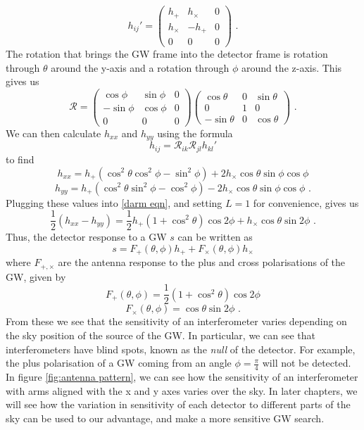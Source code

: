 \documentclass[11pt]{cuthesis}
\newcommand{\fs}{\text{ .}}
\begin{document}
\[
h_{ij}'
=
\begin{pmatrix}
h_+ & h_\times & 0 \\
h_\times & -h_+ & 0 \\
0 & 0 & 0
\end{pmatrix} \fs
\]
The rotation that brings the GW frame into the detector frame is rotation through $\theta$ around the y-axis and a rotation through $\phi$ around the z-axis. This gives us
\[
\mathcal{R}
=
\begin{pmatrix}
\cos \phi & \sin \phi & 0 \\
-\sin \phi & \cos \phi & 0 \\
0 & 0 & 0
\end{pmatrix}
\begin{pmatrix}
\cos \theta & 0 & \sin \theta \\
0 & 1 & 0 \\
-\sin \theta & 0 & \cos \theta
\end{pmatrix} \fs
\]
We can then calculate $h_{xx}$ and $h_{yy}$ using the formula
\begin{equation}
h_{ij} = \mathcal{R}_{ik} \mathcal{R}_{jl} h_{kl}'
\end{equation}
to find
\begin{equation}
h_{xx} = h_+(\cos^2 \theta \cos^2 \phi - \sin^2 \phi) + 2h_\times \cos \theta \sin\phi \cos\phi
\end{equation}
\begin{equation}
h_{yy} = h_+(\cos^2 \theta \sin^2 \phi - \cos^2 \phi) - 2h_\times \cos \theta \sin\phi \cos\phi \fs
\end{equation}
Plugging these values into \ref{darm eqn}, and setting $L=1$ for convenience, gives us
\begin{equation}
\frac{1}{2} (h_{xx} - h_{yy}) = \frac{1}{2} h_+ (1+\cos^2\theta)\cos 2\phi + h_\times \cos \theta \sin 2\phi \fs
\end{equation}
Thus, the detector response to a GW $s$ can be written as
\begin{equation}
s = F_+(\theta,\phi)h_+ + F_\times(\theta,\phi) h_\times
\end{equation}
where $F_{+,\times}$ are the antenna response to the plus and cross polarisations of the GW, given by
\begin{equation}
F_+(\theta,\phi) = \frac{1}{2} (1+\cos^2\theta)\cos 2\phi
\end{equation}
\begin{equation}
F_\times(\theta,\phi) = \cos \theta \sin 2\phi \fs
\end{equation}
From these we see that the sensitivity of an interferometer varies depending on the sky position of the source of the GW. In particular, we can see that interferometers have blind spots, known as the \textit{null} of the detector. For example, the plus polarisation of a GW coming from an angle $\phi=\frac{\pi}{4}$ will not be detected. In figure \ref{fig:antenna pattern}, we can see how the sensitivity of an interferometer with arms aligned with the x and y axes varies over the sky. In later chapters, we will see how the variation in sensitivity of each detector to different parts of the sky can be used to our advantage, and make a more sensitive GW search.
\end{document}

